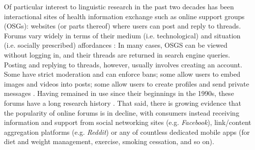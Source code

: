 \documentclass{article}
\renewcommand{\cite}{\parencite}
\begin{document}
Of particular interest to linguistic research in the past two decades has been interactional sites of health information exchange such as online support groups (OSGs): websites (or parts thereof) where users can post and reply to threads. Forums vary widely in terms of their medium (i.e. technological) and situation (i.e. socially prescribed) affordances \cite{herring_faceted_2007}: In many cases, OSGS can be viewed without logging in, and their threads are returned in search engine queries. Posting and replying to threads, however, usually involves creating an account. Some have strict moderation and can enforce bans; some allow users to embed images and videos into posts; some allow users to create profiles and send private messages \cite{morzy_analysis_2012}. Having remained in use since their beginnings in the 1990s, these forums have a long research history \cite[e.g.][]{sharf_communicating_1997}. That said, there is growing evidence that the popularity of online forums is in decline, with consumers instead receiving information and support from social networking sites (e.g. \emph{Facebook}), link\slash content aggregation platforms (e.g. \emph{Reddit}) or any of countless dedicated mobile apps (for diet and weight management, exercise, smoking cessation, and so on).
\end{document}
